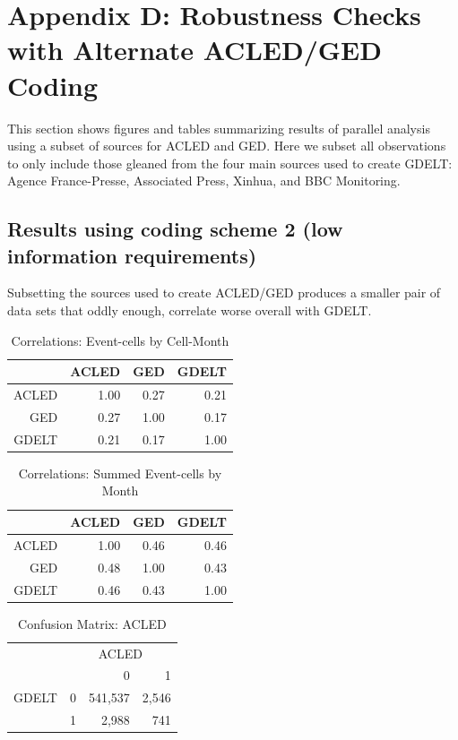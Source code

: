 \documentclass[hidelinks]{article}
\begin{document}
\pagebreak

\section*{Appendix D: Robustness Checks with Alternate ACLED/GED Coding}
This section shows figures and tables summarizing results of parallel analysis using a subset of sources for ACLED and GED. Here we subset all observations to only include those gleaned from the four main sources used to create GDELT: Agence France-Presse, Associated Press, Xinhua, and BBC Monitoring.

\subsection*{Results using coding scheme 2 (low information requirements)}
Subsetting the sources used to create ACLED/GED produces a smaller pair of data sets that oddly enough, correlate worse overall with GDELT.

\begin{table}[ht]
\centering
\begin{tabular}{rrrr}
  \hline
 & ACLED & GED & GDELT\\ 
  \hline
ACLED & 1.00 & 0.27 & 0.21 \\ 
GED & 0.27 & 1.00 & 0.17 \\ 
GDELT & 0.21 & 0.17 & 1.00 \\ 
   \hline
\end{tabular}
\caption{Correlations: Event-cells by Cell-Month} 
\end{table}

\begin{table}[ht]
\centering
\begin{tabular}{rrrr}
  \hline
 & ACLED & GED & GDELT\\ 
  \hline
ACLED & 1.00 & 0.46 & 0.46 \\ 
GED & 0.48 & 1.00 & 0.43 \\ 
GDELT & 0.46 & 0.43 & 1.00 \\ 
   \hline
\end{tabular}
\caption{Correlations: Summed Event-cells by Month} 
\end{table}

\begin{table}[ht]
\centering
\begin{tabular}{rrrr}
  \hline
   &  \multicolumn{3}{c}{ACLED}\\
& & 0 & 1 \\ 
 \hline
GDELT 	& 0 	& 541,537 	& 2,546 \\ 
 		&  1 	& 2,988 		& 741 \\ 
   \hline
\end{tabular}
\caption{Confusion Matrix: ACLED} 
\end{table}
\end{document}
